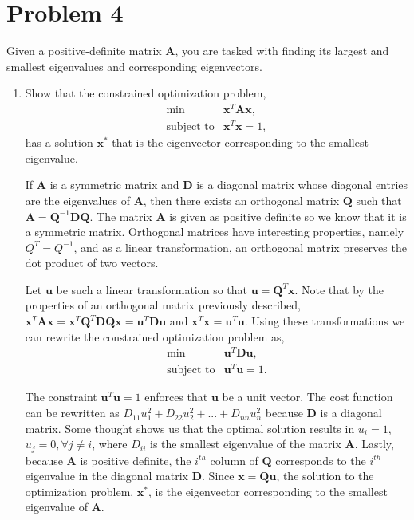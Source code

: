 \documentclass{article}
\begin{document}
\newpage

\section{Problem 4}

Given a positive-definite matrix $\mathbf{A}$, you are tasked with finding its largest and smallest eigenvalues and corresponding eigenvectors.

\begin{enumerate}
	\item Show that the constrained optimization problem,
	\begin{eqnarray*}
		\min & \mathbf{x}^T\mathbf{A}\mathbf{x}, \\
		\text{subject to} & \mathbf{x}^T\mathbf{x} = 1,
	\end{eqnarray*}
	has a solution $\mathbf{x}^*$ that is the eigenvector corresponding to the smallest eigenvalue.
	
	If $\mathbf{A}$ is a symmetric matrix and $\mathbf{D}$ is a diagonal matrix whose diagonal entries are the eigenvalues of $\mathbf{A}$, then there exists an orthogonal matrix $\mathbf{Q}$ such that $\mathbf{A} = \mathbf{Q}^{-1} \mathbf{D} \mathbf{Q}$.
	The matrix $\mathbf{A}$ is given as positive definite so we know that it is a symmetric matrix.
	Orthogonal matrices have interesting properties, namely $Q^T = Q^{-1}$, and as a linear transformation, an orthogonal matrix preserves the dot product of two vectors.
	
	Let $\mathbf{u}$ be such a linear transformation so that $\mathbf{u} = \mathbf{Q}^T\mathbf{x}$.
	Note that by the properties of an orthogonal matrix previously described, $\mathbf{x}^T\mathbf{A}\mathbf{x} = \mathbf{x}^T\mathbf{Q}^T \mathbf{D} \mathbf{Q}\mathbf{x} = \mathbf{u}^T\mathbf{D}\mathbf{u}$ and $\mathbf{x}^T\mathbf{x} = \mathbf{u}^T\mathbf{u}$.
	Using these transformations we can rewrite the constrained optimization problem as,
	\begin{eqnarray*}
		\min & \mathbf{u}^T\mathbf{D}\mathbf{u}, \\
		\text{subject to} & \mathbf{u}^T\mathbf{u} = 1.
	\end{eqnarray*}
	
	The constraint $\mathbf{u}^T\mathbf{u} = 1$ enforces that $\mathbf{u}$ be a unit vector.
	The cost function can be rewritten as $D_{11} u_1^2 + D_{22} u_2^2 + ... + D_{nn} u_n^2$ because $\mathbf{D}$ is a diagonal matrix.
	Some thought shows us that the optimal solution results in $u_i = 1$, $u_j = 0, \forall j \ne i$, where $D_{ii}$ is the smallest eigenvalue of the matrix $\mathbf{A}$.
	Lastly, because $\mathbf{A}$ is positive definite, the $i^{th}$ column of $\mathbf{Q}$ corresponds to the $i^{th}$ eigenvalue in the diagonal matrix $\mathbf{D}$.
	Since $\mathbf{x} = \mathbf{Q} \mathbf{u}$, the solution to the optimization problem, $\mathbf{x}^*$, is the eigenvector corresponding to the smallest eigenvalue of $\mathbf{A}$.
	

\end{enumerate}
\end{document}
